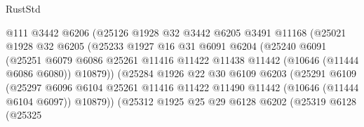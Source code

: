 \begin{lexlean}{RustStd}
\begin{coremodule}
                              @111
                              @3442
                              @6206
                              (@25126
                                @1928
                                @32
                                @3442
                                @6205
                                @3491
                                @11168
                                (@25021
                                  @1928
                                  @32
                                  @6205
                                  (@25233
                                    @1927
                                    @16
                                    @31
                                    @6091
                                    @6204
                                    (@25240
                                      @6091
                                      (@25251
                                        @6079
                                        @6086
                                        @25261
                                        @11416
                                        @11422
                                        @11438
                                        @11442
                                        (@10646 (@11444 @6086 @6080))
                                        @10879))
                                    (@25284
                                      @1926
                                      @22
                                      @30
                                      @6109
                                      @6203
                                      (@25291
                                        @6109
                                        (@25297
                                          @6096
                                          @6104
                                          @25261
                                          @11416
                                          @11422
                                          @11490
                                          @11442
                                          (@10646 (@11444 @6104 @6097))
                                          @10879))
                                      (@25312
                                        @1925
                                        @25
                                        @29
                                        @6128
                                        @6202
                                        (@25319
                                          @6128
                                          (@25325

\end{coremodule}
\end{lexlean}
